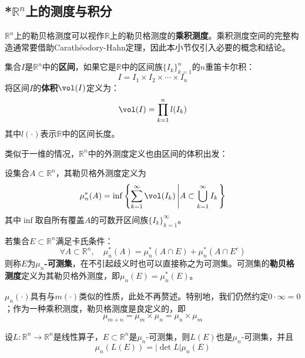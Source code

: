 
\subsection{\texorpdfstring{*$\mathbb{R}^n$上的测度与积分}{*Rn上的测度与积分}}

$\mathbb{R}^n$上的勒贝格测度可以视作$\mathbb{R}$上的勒贝格测度的\textbf{乘积测度}。乘积测度空间的完整构造通常要借助Carathéodory-Hahn定理，因此本小节仅引入必要的概念和结论。

\begin{definition}[区间]
    集合$I$是$\mathbb{R}^n$中的\textbf{区间}，如果它是$\mathbb{R}$中的区间族$\{I_k\}_{k=1}^n$的$n$重笛卡尔积：
    $$I=I_1\times I_2\times\cdots\times I_n$$
    将区间$I$的\textbf{体积}$\vol(I)$定义为：
    $$\vol(I)=\prod_{k=1}^n l(I_k)$$
    其中$l(\cdot)$表示$\mathbb{R}$中的区间长度。
\end{definition}

类似于一维的情况，$\mathbb{R}^n$中的外测度定义也由区间的体积出发：

\begin{definition}
    设集合$A\subset\mathbb{R}^n$，其勒贝格外测度定义为
    \[\mu_n^*(A)=\inf\left\{\sum_{k=1}^{\infty}\vol(I_k)\left|A\subset\bigcup_{k=1}^{\infty}I_k\right.\right\}\]
    其中$\inf$取自所有覆盖$A$的可数开区间族$\{I_k\}_{k=1}^{\infty}$。
\end{definition}

\begin{definition}
    若集合$E\subset \mathbb{R}^n$满足卡氏条件：
    $$\forall A\subset \mathbb{R}^n,\quad \mu_n^*(A)=\mu_n^*(A\cap E)+\mu_n^*(A\cap E^c)$$
    则称$E$为\textbf{$\mu_n$-可测集}，在不引起歧义时也可以直接称之为可测集。可测集的\textbf{勒贝格测度}定义为其勒贝格外测度，即$\mu_n(E)=\mu_n^*(E)$。
\end{definition}

$\mu_n(\cdot)$具有与$m(\cdot)$类似的性质，此处不再赘述。特别地，我们仍然约定$0\cdot\infty=0$；作为一种乘积测度，勒贝格测度是良定义的，即
$$\mu_{m+n}=\mu_m\times \mu_n=\mu_n\times \mu_m$$

\begin{claim}
    设$L:\mathbb{R}^n\to \mathbb{R}^n$是线性算子，$E\subset\mathbb{R}^n$是$\mu_n$-可测集，则$L(E)$也是$\mu_n$-可测集，并且
    $$\mu_n(L(E))=|\det L|\mu_n(E)$$
\end{claim}

